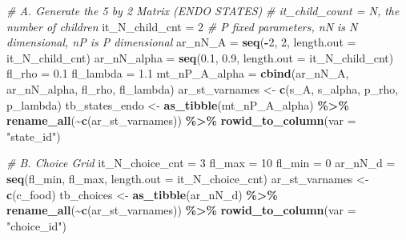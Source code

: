 \documentclass[
]{book}
\newenvironment{Shaded}{\begin{snugshade}}{\end{snugshade}}
\newcommand{\CommentTok}[1]{\textcolor[rgb]{0.56,0.35,0.01}{\textit{#1}}}
\newcommand{\DataTypeTok}[1]{\textcolor[rgb]{0.13,0.29,0.53}{#1}}
\newcommand{\DecValTok}[1]{\textcolor[rgb]{0.00,0.00,0.81}{#1}}
\newcommand{\FloatTok}[1]{\textcolor[rgb]{0.00,0.00,0.81}{#1}}
\newcommand{\KeywordTok}[1]{\textcolor[rgb]{0.13,0.29,0.53}{\textbf{#1}}}
\newcommand{\NormalTok}[1]{#1}
\newcommand{\OperatorTok}[1]{\textcolor[rgb]{0.81,0.36,0.00}{\textbf{#1}}}
\newcommand{\StringTok}[1]{\textcolor[rgb]{0.31,0.60,0.02}{#1}}
\begin{document}
\begin{Shaded}
\begin{Highlighting}[]
\CommentTok{\# A. Generate the 5 by 2 Matrix (ENDO STATES)}
\CommentTok{\# it\_child\_count = N, the number of children}
\NormalTok{it\_N\_child\_cnt =}\StringTok{ }\DecValTok{2}
\CommentTok{\# P fixed parameters, nN is N dimensional, nP is P dimensional}
\NormalTok{ar\_nN\_A =}\StringTok{ }\KeywordTok{seq}\NormalTok{(}\OperatorTok{{-}}\DecValTok{2}\NormalTok{, }\DecValTok{2}\NormalTok{, }\DataTypeTok{length.out =}\NormalTok{ it\_N\_child\_cnt)}
\NormalTok{ar\_nN\_alpha =}\StringTok{ }\KeywordTok{seq}\NormalTok{(}\FloatTok{0.1}\NormalTok{, }\FloatTok{0.9}\NormalTok{, }\DataTypeTok{length.out =}\NormalTok{ it\_N\_child\_cnt)}
\NormalTok{fl\_rho =}\StringTok{ }\FloatTok{0.1}
\NormalTok{fl\_lambda =}\StringTok{ }\FloatTok{1.1}
\NormalTok{mt\_nP\_A\_alpha =}\StringTok{ }\KeywordTok{cbind}\NormalTok{(ar\_nN\_A, ar\_nN\_alpha, fl\_rho, fl\_lambda)}
\NormalTok{ar\_st\_varnames \textless{}{-}}\StringTok{ }\KeywordTok{c}\NormalTok{(}\StringTok{\textquotesingle{}s\_A\textquotesingle{}}\NormalTok{, }\StringTok{\textquotesingle{}s\_alpha\textquotesingle{}}\NormalTok{, }\StringTok{\textquotesingle{}p\_rho\textquotesingle{}}\NormalTok{, }\StringTok{\textquotesingle{}p\_lambda\textquotesingle{}}\NormalTok{)}
\NormalTok{tb\_states\_endo \textless{}{-}}\StringTok{ }\KeywordTok{as\_tibble}\NormalTok{(mt\_nP\_A\_alpha) }\OperatorTok{\%\textgreater{}\%}
\StringTok{  }\KeywordTok{rename\_all}\NormalTok{(}\OperatorTok{\textasciitilde{}}\KeywordTok{c}\NormalTok{(ar\_st\_varnames)) }\OperatorTok{\%\textgreater{}\%}
\StringTok{  }\KeywordTok{rowid\_to\_column}\NormalTok{(}\DataTypeTok{var =} \StringTok{"state\_id"}\NormalTok{)}

\CommentTok{\# B. Choice Grid}
\NormalTok{it\_N\_choice\_cnt =}\StringTok{ }\DecValTok{3}
\NormalTok{fl\_max =}\StringTok{ }\DecValTok{10}
\NormalTok{fl\_min =}\StringTok{ }\DecValTok{0}
\NormalTok{ar\_nN\_d =}\StringTok{ }\KeywordTok{seq}\NormalTok{(fl\_min, fl\_max, }\DataTypeTok{length.out =}\NormalTok{ it\_N\_choice\_cnt)}
\NormalTok{ar\_st\_varnames \textless{}{-}}\StringTok{ }\KeywordTok{c}\NormalTok{(}\StringTok{\textquotesingle{}c\_food\textquotesingle{}}\NormalTok{)}
\NormalTok{tb\_choices \textless{}{-}}\StringTok{ }\KeywordTok{as\_tibble}\NormalTok{(ar\_nN\_d) }\OperatorTok{\%\textgreater{}\%}
\StringTok{  }\KeywordTok{rename\_all}\NormalTok{(}\OperatorTok{\textasciitilde{}}\KeywordTok{c}\NormalTok{(ar\_st\_varnames)) }\OperatorTok{\%\textgreater{}\%}
\StringTok{  }\KeywordTok{rowid\_to\_column}\NormalTok{(}\DataTypeTok{var =} \StringTok{"choice\_id"}\NormalTok{)}


\end{Highlighting}
\end{Shaded}
\end{document}
